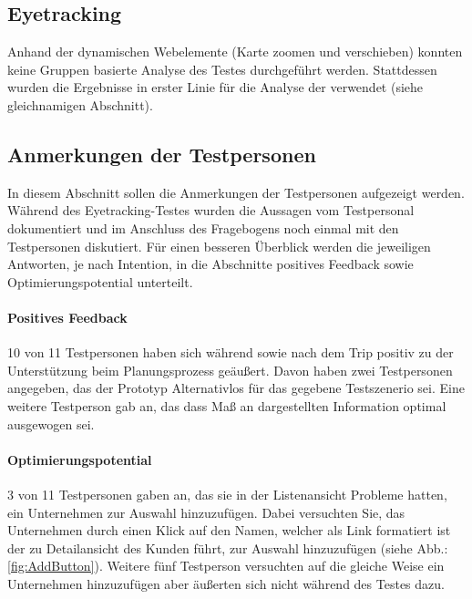 \documentclass[Bachelorarbeit.tex]{subfiles}
\begin{document}
\subsection{Eyetracking}
Anhand der dynamischen Webelemente (Karte zoomen und verschieben) konnten keine Gruppen basierte Analyse des Testes durchgeführt werden. 
Stattdessen wurden die Ergebnisse in erster Linie für die Analyse der  verwendet (siehe gleichnamigen Abschnitt). 

\subsection{Anmerkungen der Testpersonen}
\label{AnmerkungUser}
In diesem Abschnitt sollen die Anmerkungen der Testpersonen aufgezeigt werden. 
Während des Eyetracking-Testes wurden die Aussagen vom Testpersonal dokumentiert und im Anschluss des Fragebogens noch einmal mit den Testpersonen diskutiert.
Für einen besseren Überblick werden die jeweiligen Antworten, je nach Intention, in die Abschnitte positives Feedback sowie Optimierungspotential unterteilt. 

\paragraph{Positives Feedback}
10 von 11 Testpersonen haben sich während sowie nach dem Trip positiv zu der Unterstützung beim Planungsprozess geäußert. 
Davon haben zwei Testpersonen angegeben, das der Prototyp Alternativlos für das gegebene Testszenerio sei.  
Eine weitere Testperson gab an, das dass Maß an dargestellten Information optimal ausgewogen sei.

\paragraph{Optimierungspotential}
3 von 11 Testpersonen gaben an, das sie in der Listenansicht Probleme hatten, ein Unternehmen zur Auswahl hinzuzufügen.
Dabei versuchten Sie, das Unternehmen durch einen Klick auf den Namen, welcher als Link formatiert ist der zu Detailansicht des Kunden führt, zur Auswahl hinzuzufügen (siehe Abb.: \ref{fig:AddButton}).
Weitere fünf Testperson versuchten auf die gleiche Weise ein Unternehmen hinzuzufügen aber äußerten sich nicht während des Testes dazu.
\end{document}
